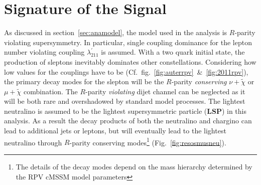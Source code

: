 \chapter{Signature of the Signal}
\label{cha:sig}

As discussed in section~\ref{sec:anamodel}, the model used in the analysis is $R$-parity violating supersymmetry. In particular, single coupling dominance for the lepton number violating coupling $\lambda^\prime_{211}$ is assumed. With a two quark initial state, the production of sleptons inevitably dominates other constellations. Considering how low values for the couplings have to be (Cf.~fig.~\ref{fig:auterrpv}~\&~\ref{fig:2011rpv}), the primary decay modes for the slepton will be the $R$-parity \textit{conserving} $\nu + \tilde{\chi}$ or $\mu + \tilde{\chi}$ combination. The $R$-parity \textit{violating} dijet channel can be neglected as it will be both rare and overshadowed by standard model processes. The lightest neutralino is assumed to be the lightest supersymmetric particle (\textbf{LSP}) in this analysis. As a result the decay products of both the neutralino and chargino can lead to additional jets or leptons, but will eventually lead to the lightest neutralino through $R$-parity conserving modes\footnote{The details of the decay modes depend on the mass hierarchy determined by the RPV cMSSM model parameters} (Fig.~\ref{fig:resosmusneu}). 


